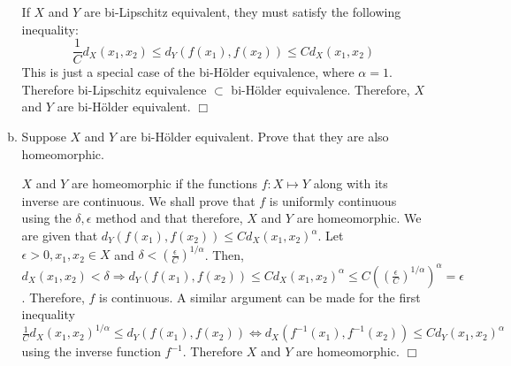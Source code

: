 \documentclass[12pt,letterpaper,reqno]{amsart}
\begin{document}
\begin{enumerate}[1.]
\begin{enumerate}[(a)]
\begin{flushleft}
If $X$ and $Y$ are bi-Lipschitz equivalent, they must satisfy the following inequality:
$$\frac{1}{C}d_X(x_1, x_2) \leq d_Y(f(x_1),f(x_2)) \leq Cd_X(x_1, x_2)$$
This is just a special case of the bi-H\"older equivalence, where $\alpha = 1$. Therefore bi-Lipschitz equivalence $\subset$ bi-H\"older equivalence. Therefore, $X$ and $Y$ are bi-H\"older equivalent. $\Box$
\end{flushleft}

\item Suppose $X$ and $Y$ are bi-H\"older equivalent. Prove that they are also homeomorphic.

\begin{flushleft}
$X$ and $Y$ are homeomorphic if the functions $f:X\mapsto Y$ along with its inverse are continuous. We shall prove that $f$ is uniformly continuous using the $\delta, \epsilon$ method and that therefore, $X$ and $Y$ are homeomorphic. We are given that $d_Y(f(x_1),f(x_2)) \leq Cd_X(x_1, x_2)^\alpha$. Let $\epsilon > 0, x_1, x_2 \in X$ and $\delta < (\frac{\epsilon}{C})^{1/\alpha}$. Then, $d_X(x_1, x_2) < \delta \Rightarrow d_Y(f(x_1),f(x_2)) \leq Cd_X(x_1, x_2)^\alpha \leq C((\frac{\epsilon}{C})^{1/\alpha})^\alpha = \epsilon$. Therefore, $f$ is continuous. A similar argument can be made for the first inequality $\frac{1}{C}d_X(x_1, x_2)^{1/\alpha} \leq d_Y(f(x_1),f(x_2)) \Leftrightarrow d_X(f^{-1}(x_1), f^{-1}(x_2)) \leq Cd_Y(x_1,x_2)^\alpha$ using the inverse function $f^{-1}$. Therefore $X$ and $Y$ are homeomorphic. $\Box$
\end{flushleft}

\end{enumerate}
\end{enumerate}
\end{document}
